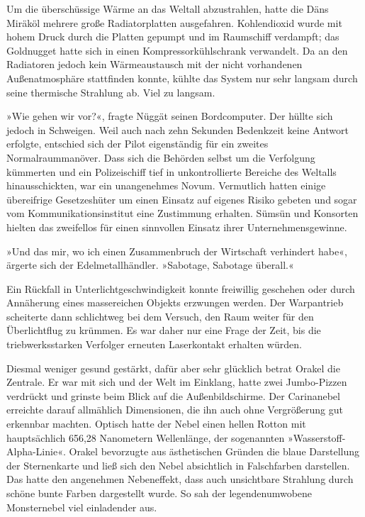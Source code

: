 Um die überschüssige Wärme an das Weltall abzustrahlen, hatte die Däns Miräköl mehrere große Radiatorplatten ausgefahren. Kohlendioxid wurde mit hohem Druck durch die Platten gepumpt und im Raumschiff verdampft; das Goldnugget hatte sich in einen Kompressorkühlschrank verwandelt. Da an den Radiatoren jedoch kein Wärmeaustausch mit der nicht vorhandenen Außenatmosphäre stattfinden konnte, kühlte das System nur sehr langsam durch seine thermische Strahlung ab. Viel zu langsam.

»Wie gehen wir vor?«, fragte Nüggät seinen Bordcomputer. Der hüllte sich jedoch in Schweigen. Weil auch nach zehn Sekunden Bedenkzeit keine Antwort erfolgte, entschied sich der Pilot eigenständig für ein zweites Normalraummanöver. Dass sich die Behörden selbst um die Verfolgung kümmerten und ein Polizeischiff tief in unkontrollierte Bereiche des Weltalls hinausschickten, war ein unangenehmes Novum. Vermutlich hatten einige übereifrige Gesetzeshüter um einen Einsatz auf eigenes Risiko gebeten und sogar vom Kommunikationsinstitut eine Zustimmung erhalten. Sümsün und Konsorten hielten das zweifellos für einen sinnvollen Einsatz ihrer Unternehmensgewinne.

»Und das mir, wo ich einen Zusammenbruch der Wirtschaft verhindert habe«, ärgerte sich der Edelmetallhändler. »Sabotage, Sabotage überall.«

Ein Rückfall in Unterlichtgeschwindigkeit konnte freiwillig geschehen oder durch Annäherung eines massereichen Objekts erzwungen werden. Der Warpantrieb scheiterte dann schlichtweg bei dem Versuch, den Raum weiter für den Überlichtflug zu krümmen. Es war daher nur eine Frage der Zeit, bis die triebwerksstarken Verfolger erneuten Laserkontakt erhalten würden.

\cleardoubleevenpage



Diesmal weniger gesund gestärkt, dafür aber sehr glücklich betrat Orakel die Zentrale. Er war mit sich und der Welt im Einklang, hatte zwei Jumbo-Pizzen verdrückt und grinste beim Blick auf die Außenbildschirme. Der Carinanebel erreichte darauf allmählich Dimensionen, die ihn auch ohne Vergrößerung gut erkennbar machten. Optisch hatte der Nebel einen hellen Rotton mit hauptsächlich 656,28 Nanometern Wellenlänge, der sogenannten »Wasserstoff-Alpha-Linie«. Orakel bevorzugte aus ästhetischen Gründen die blaue Darstellung der Sternenkarte und ließ sich den Nebel absichtlich in Falschfarben darstellen. Das hatte den angenehmen Nebeneffekt, dass auch unsichtbare Strahlung durch schöne bunte Farben dargestellt wurde. So sah der legendenumwobene Monsternebel viel einladender aus.

